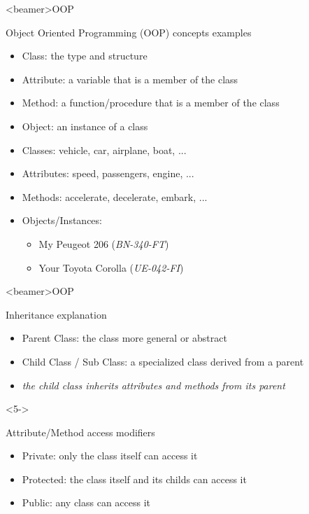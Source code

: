 \begin{frame}<beamer>{OOP}

  Object Oriented Programming (OOP) concepts examples

  \begin{itemize}
    \item<1-> Class: the type and structure
    \item<1-> Attribute: a variable that is a member of the class
    \item<1-> Method: a function/procedure that is a member of the class
    \item<1-> Object: an instance of a class
  \end{itemize}

  \begin{itemize}
    \item<2-> Classes: vehicle, car, airplane, boat, ...
    \item<3-> Attributes: speed, passengers, engine, ...
    \item<4-> Methods: accelerate, decelerate, embark, ...
    \item<5-> Objects/Instances:
      \begin{itemize}
        \item<5-> My Peugeot 206 (\textit{BN-340-FT})
        \item<5-> Your Toyota Corolla (\textit{UE-042-FI})
      \end{itemize}
  \end{itemize}

\end{frame}


\begin{frame}<beamer>{OOP}

  Inheritance explanation

  \begin{itemize}
    \item<2-> Parent Class: the class more general or abstract
    \item<3-> Child Class / Sub Class: a specialized class derived from a parent
    \item<4-> \textit{the child class inherits attributes and methods from its parent}
  \end{itemize}

  \begin{onlyenv}<5->
    \vspace*{1cm}

    Attribute/Method access modifiers
  \end{onlyenv}

  \begin{itemize}
    \item<6-> Private: only the class itself can access it
    \item<7-> Protected: the class itself and its childs can access it
    \item<8-> Public: any class can access it
  \end{itemize}

\end{frame}

